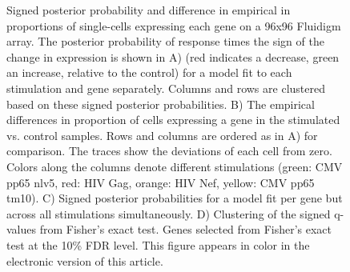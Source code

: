 \documentclass[12pt,oupdraft]{biostatistics}
\begin{document}
\begin{figure}
\caption{Signed posterior probability and difference in empirical  in proportions of single-cells expressing each gene on a 96x96 Fluidigm array. The posterior probability of response times the sign of the change in expression is shown in A) (red indicates a decrease, green an increase, relative to the control) for a model fit to each stimulation and gene separately. Columns and rows are clustered based on these signed posterior probabilities. B) The empirical differences in proportion of cells expressing a gene in the stimulated vs. control samples. Rows and columns are ordered as in A) for comparison. The traces show the deviations of each cell from zero. Colors along the columns denote different stimulations (green: CMV pp65 nlv5, red: HIV Gag, orange: HIV Nef, yellow: CMV pp65 tm10). C) Signed posterior probabilities for a model fit per gene but across all stimulations simultaneously. D) Clustering of the signed q-values from Fisher's exact test. Genes selected from Fisher's exact test at the 10\% FDR level. This figure appears in color in the electronic version of this article.}
\label{fig:fluidigm}
\end{figure}
\end{document}
